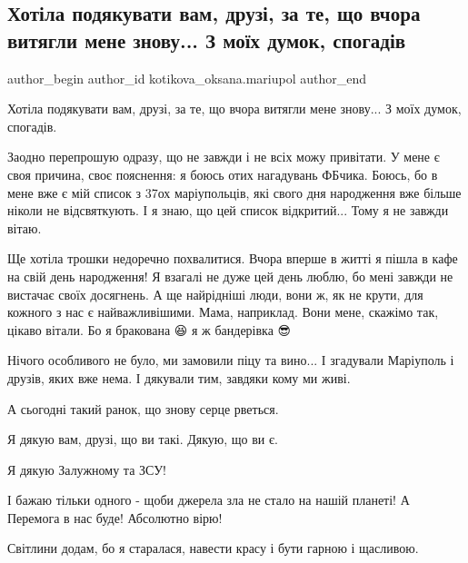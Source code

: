  
 
 
 
 

\subsection{Хотіла подякувати вам, друзі, за те, що вчора витягли мене знову... З моїх думок, спогадів}
\label{sec:18_01_2023.fb.kotikova_oksana.mariupol.1.khot_la_podyakuvati_}

\ifcmt
 author_begin
   author_id kotikova_oksana.mariupol
 author_end
\fi

Хотіла подякувати вам, друзі, за те, що вчора витягли мене знову... З моїх
думок, спогадів.

Заодно перепрошую одразу, що не завжди і не всіх можу привітати. У мене є своя
причина, своє пояснення: я боюсь отих нагадувань ФБчика. Боюсь, бо в мене вже є
мій список з 37ох маріупольців, які свого дня народження вже більше ніколи не
відсвяткують. І я знаю, що цей список відкритий... Тому я не завжди вітаю. 

Ще хотіла трошки недоречно похвалитися. Вчора вперше в житті я пішла в кафе на
свій день народження! Я взагалі не дуже цей день люблю, бо мені завжди не
вистачає своїх досягнень. А ще найрідніші люди, вони ж, як не крути, для
кожного з нас є найважливішими. Мама, наприклад. Вони мене, скажімо так, цікаво
вітали. Бо я бракована 😆 я ж бандерівка 😎 

Нічого особливого не було, ми замовили піцу та вино... І згадували Маріуполь і
друзів, яких вже нема. І дякували тим, завдяки кому ми живі.

А сьогодні такий ранок, що знову серце рветься. 

Я дякую вам, друзі, що ви такі. Дякую, що ви є.

Я дякую Залужному та ЗСУ!

І бажаю тільки одного - щоби джерела зла не стало на нашій планеті! А Перемога
в нас буде! Абсолютно вірю!

Світлини додам, бо я старалася, навести красу і бути гарною і щасливою.

